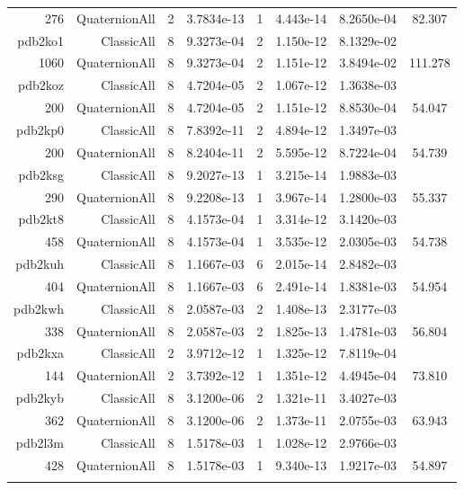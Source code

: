 \begin{xltabular}{\textwidth}{r|rcS[table-format=1.4e+2]cS[table-format=1.3e+2]S[table-format=1.4e+2]S[table-format=-1.3]}
276 & QuaternionAll & 2 & 3.7834e-13 & 1 & 4.443e-14 & 8.2650e-04 & 82.307\\  \addlinespace
pdb2ko1 & ClassicAll & 8 & 9.3273e-04 & 2 & 1.150e-12 & 8.1329e-02 & \\
1060 & QuaternionAll & 8 & 9.3273e-04 & 2 & 1.151e-12 & 3.8494e-02 & 111.278\\  \addlinespace
pdb2koz & ClassicAll & 8 & 4.7204e-05 & 2 & 1.067e-12 & 1.3638e-03 & \\
200 & QuaternionAll & 8 & 4.7204e-05 & 2 & 1.151e-12 & 8.8530e-04 & 54.047\\  \addlinespace
pdb2kp0 & ClassicAll & 8 & 7.8392e-11 & 2 & 4.894e-12 & 1.3497e-03 & \\
200 & QuaternionAll & 8 & 8.2404e-11 & 2 & 5.595e-12 & 8.7224e-04 & 54.739\\  \addlinespace
pdb2ksg & ClassicAll & 8 & 9.2027e-13 & 1 & 3.215e-14 & 1.9883e-03 & \\
290 & QuaternionAll & 8 & 9.2208e-13 & 1 & 3.967e-14 & 1.2800e-03 & 55.337\\  \addlinespace
pdb2kt8 & ClassicAll & 8 & 4.1573e-04 & 1 & 3.314e-12 & 3.1420e-03 & \\
458 & QuaternionAll & 8 & 4.1573e-04 & 1 & 3.535e-12 & 2.0305e-03 & 54.738\\  \addlinespace
pdb2kuh & ClassicAll & 8 & 1.1667e-03 & 6 & 2.015e-14 & 2.8482e-03 & \\
404 & QuaternionAll & 8 & 1.1667e-03 & 6 & 2.491e-14 & 1.8381e-03 & 54.954\\  \addlinespace
pdb2kwh & ClassicAll & 8 & 2.0587e-03 & 2 & 1.408e-13 & 2.3177e-03 & \\
338 & QuaternionAll & 8 & 2.0587e-03 & 2 & 1.825e-13 & 1.4781e-03 & 56.804\\  \addlinespace
pdb2kxa & ClassicAll & 2 & 3.9712e-12 & 1 & 1.325e-12 & 7.8119e-04 & \\
144 & QuaternionAll & 2 & 3.7392e-12 & 1 & 1.351e-12 & 4.4945e-04 & 73.810\\  \addlinespace
pdb2kyb & ClassicAll & 8 & 3.1200e-06 & 2 & 1.321e-11 & 3.4027e-03 & \\
362 & QuaternionAll & 8 & 3.1200e-06 & 2 & 1.373e-11 & 2.0755e-03 & 63.943\\  \addlinespace
pdb2l3m & ClassicAll & 8 & 1.5178e-03 & 1 & 1.028e-12 & 2.9766e-03 & \\
428 & QuaternionAll & 8 & 1.5178e-03 & 1 & 9.340e-13 & 1.9217e-03 & 54.897\\  \addlinespace

\end{xltabular}
